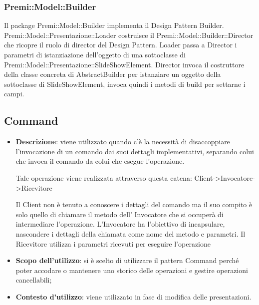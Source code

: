 {{		\subsubsection{Premi::Model::Builder}{
			Il package Premi::Model::Builder implementa il Design Pattern Builder. Premi::Model::Presentazione::Loader costruisce il Premi::Model::Builder::Director che ricopre il ruolo di director del Design Pattern.
			Loader passa a Director i parametri di istanziazione dell'oggetto di una sottoclasse di Premi::Model::Presentazione::SlideShowElement.
			Director invoca il costruttore della classe concreta di AbstractBuilder per istanziare un oggetto della sottoclasse di SlideShowElement, invoca quindi i metodi di build  per settarne i campi.
		}
	}
	\subsection{Command}{
	
		\begin{itemize}
			\item \textbf{Descrizione}: viene utilizzato quando c'è la necessità di disaccoppiare l’invocazione di un comando dai suoi dettagli implementativi, separando colui che invoca il comando da colui che esegue l’operazione.
			
			Tale operazione viene realizzata attraverso questa catena: Client->Invocatore->Ricevitore
			
			Il Client non è tenuto a conoscere i dettagli del comando ma il suo compito è solo quello di chiamare il metodo dell’ Invocatore che si occuperà di intermediare l’operazione.
			L’Invocatore ha l’obiettivo di incapsulare, nascondere i dettagli della chiamata come nome del metodo e parametri.
			Il Ricevitore utilizza i parametri ricevuti per eseguire l’operazione
			\item \textbf{Scopo dell’utilizzo}: si è scelto di utilizzare il pattern Command perché poter accodare o mantenere uno storico delle operazioni e	gestire operazioni cancellabili;
			\item \textbf{Contesto d’utilizzo}: viene utilizzato in fase di modifica delle presentazioni.
		\end{itemize}
}}
